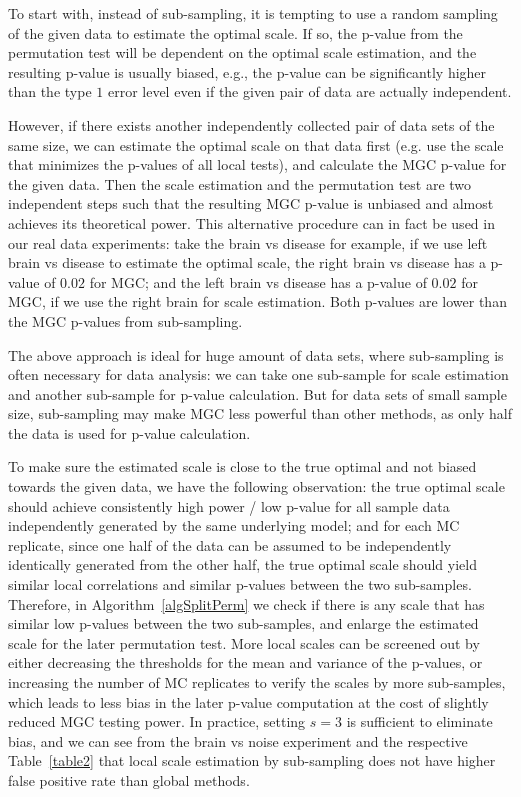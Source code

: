 \documentclass[11pt]{article}
\begin{document}
To start with, instead of sub-sampling, it is tempting to use a random sampling of the given data to estimate the optimal scale. If so, the p-value from the permutation test will be dependent on the optimal scale estimation, and the resulting p-value is usually biased, e.g., the p-value can be significantly higher than the type $1$ error level even if the given pair of data are actually independent. 

However, if there exists another independently collected pair of data sets of the same size, we can estimate the optimal scale on that data first (e.g. use the scale that minimizes the p-values of all local tests), and calculate the MGC p-value for the given data. Then the scale estimation and the permutation test are two independent steps such that the resulting MGC p-value is unbiased and almost achieves its theoretical power. This alternative procedure can in fact be used in our real data experiments: take the brain vs disease for example, if we use left brain vs disease to estimate the optimal scale, the right brain vs disease has a p-value of $0.02$ for MGC; and the left brain vs disease has a p-value of $0.02$ for MGC, if we use the right brain for scale estimation. Both p-values are lower than the MGC p-values from sub-sampling.

The above approach is ideal for huge amount of data sets, where sub-sampling is often necessary for data analysis: we can take one sub-sample for scale estimation and another sub-sample for p-value calculation. But for data sets of small sample size, sub-sampling may make MGC less powerful than other methods, as only half the data is used for p-value calculation.

To make sure the estimated scale is close to the true optimal and not biased towards the given data, we have the following observation: the true optimal scale should achieve consistently high power / low p-value for all sample data independently generated by the same underlying model; and for each MC replicate, since one half of the data can be assumed to be independently identically generated from the other half, the true optimal scale should yield similar local correlations and similar p-values between the two sub-samples. Therefore, in Algorithm~\ref{algSplitPerm} we check if there is any scale that has similar low p-values between the two sub-samples, and enlarge the estimated scale for the later permutation test. More local scales can be screened out by either decreasing the thresholds for the mean and variance of the p-values, or increasing the number of MC replicates to verify the scales by more sub-samples, which leads to less bias in the later p-value computation at the cost of slightly reduced MGC testing power. In practice, setting $s=3$ is sufficient to eliminate bias, and we can see from the brain vs noise experiment and the respective Table~\ref{table2} that local scale estimation by sub-sampling does not have higher false positive rate than global methods.
\end{document}
